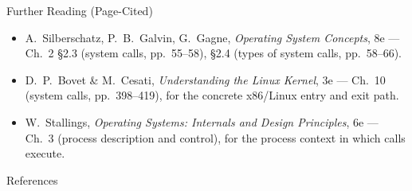 \documentclass[aspectratio=169]{beamer}
\begin{document}
\begin{frame}{Further Reading (Page-Cited)}
  \footnotesize
  \begin{itemize}
    \item A.~Silberschatz, P.~B.~Galvin, G.~Gagne, \emph{Operating System
      Concepts}, 8e --- Ch.~2 \S2.3 (system calls, pp.~55--58), \S2.4 (types
      of system calls, pp.~58--66).
    \item D.~P.~Bovet \& M.~Cesati, \emph{Understanding the Linux Kernel}, 3e
      --- Ch.~10 (system calls, pp.~398--419), for the concrete x86/Linux
      entry and exit path.
    \item W.~Stallings, \emph{Operating Systems: Internals and Design
      Principles}, 6e --- Ch.~3 (process description and control), for the
      process context in which calls execute.
  \end{itemize}
  \vspace{0.2cm}
\end{frame}

\begin{frame}[allowframebreaks]{References}
  \footnotesize
  
  
\end{frame}
\end{document}
